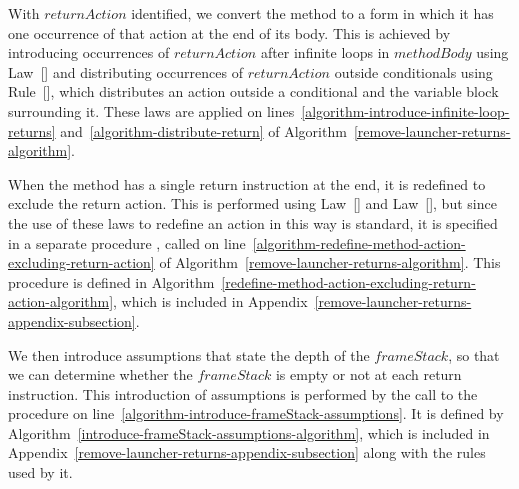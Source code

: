 With $returnAction$ identified, we convert the method to a form in
which it has one occurrence of that action at the end of its body.
This is achieved by introducing occurrences of $returnAction$ after
infinite loops in $methodBody$ using
Law~[] and distributing occurrences of
$returnAction$ outside conditionals using
Rule~[], which distributes an action
outside a \Circus{} conditional and the variable block surrounding it.
These laws are applied on
lines~\ref{algorithm-introduce-infinite-loop-returns}
and~\ref{algorithm-distribute-return} of
Algorithm~\ref{remove-launcher-returns-algorithm}.

When the method has a single return instruction at the end, it is
redefined to exclude the return action.
This is performed using Law~[] and
Law~[], but since the use of these laws to
redefine an action in this way is standard, it is specified in a
separate procedure
,
called on
line~\ref{algorithm-redefine-method-action-excluding-return-action} of
Algorithm~\ref{remove-launcher-returns-algorithm}.
This procedure is defined in
Algorithm~\ref{redefine-method-action-excluding-return-action-algorithm},
which is included in
Appendix~\ref{remove-launcher-returns-appendix-subsection}.

We then introduce assumptions that state the depth of the
$frameStack$, so that we can determine whether the $frameStack$ is
empty or not at each return instruction.
This introduction of assumptions is performed by the call to the
 procedure on
line~\ref{algorithm-introduce-frameStack-assumptions}.
It is defined by
Algorithm~\ref{introduce-frameStack-assumptions-algorithm}, which is
included in Appendix~\ref{remove-launcher-returns-appendix-subsection}
along with the rules used by it.

